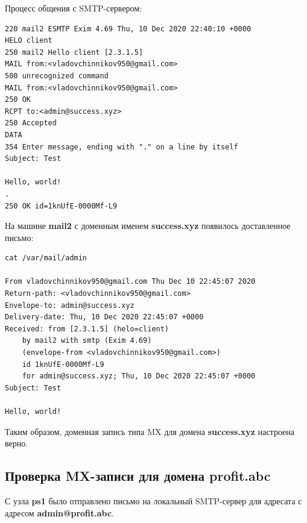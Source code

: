 \documentclass[a4paper,12pt]{article}
\begin{document}
Процесс общения с SMTP-сервером:
\begin{verbatim}
220 mail2 ESMTP Exim 4.69 Thu, 10 Dec 2020 22:40:10 +0000
HELO client
250 mail2 Hello client [2.3.1.5]
MAIL from:<vladovchinnikov950@gmail.com>
500 unrecognized command
MAIL from:<vladovchinnikov950@gmail.com>
250 OK
RCPT to:<admin@success.xyz>
250 Accepted
DATA
354 Enter message, ending with "." on a line by itself
Subject: Test

Hello, world!
.
250 OK id=1knUfE-0000Mf-L9
\end{verbatim}

На машине \textbf{mail2} с доменным именем \textbf{success.xyz} появилось доставленное письмо:
\begin{verbatim}
cat /var/mail/admin

From vladovchinnikov950@gmail.com Thu Dec 10 22:45:07 2020
Return-path: <vladovchinnikov950@gmail.com>
Envelope-to: admin@success.xyz
Delivery-date: Thu, 10 Dec 2020 22:45:07 +0000
Received: from [2.3.1.5] (helo=client)
	by mail2 with smtp (Exim 4.69)
	(envelope-from <vladovchinnikov950@gmail.com>)
	id 1knUfE-0000Mf-L9
	for admin@success.xyz; Thu, 10 Dec 2020 22:45:07 +0000
Subject: Test

Hello, world!
\end{verbatim}

Таким образом, доменная запись типа MX для домена \textbf{success.xyz} настроена верно.

\subsection{Проверка MX-записи для домена \textbf{profit.abc}}

С узла \textbf{ps1} было отправлено письмо на локальный SMTP-сервер для адресата с адресом \textbf{admin@profit.abc}.
\end{document}
